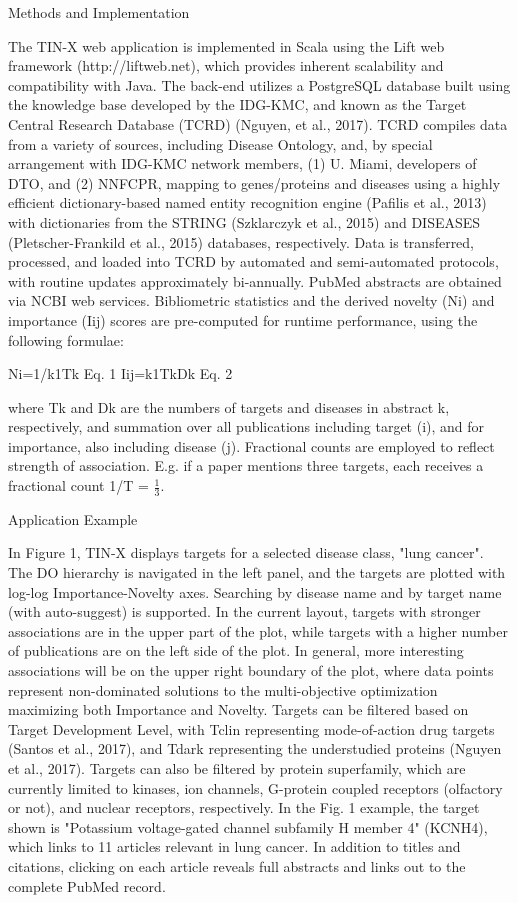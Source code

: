 Methods and Implementation

The TIN-X web application is implemented in Scala using the Lift web framework (http://liftweb.net), which provides inherent scalability and compatibility with Java.  The back-end utilizes a PostgreSQL database built using the knowledge base developed by the IDG-KMC, and known as the Target Central Research Database (TCRD) (Nguyen, et al., 2017).  TCRD compiles data from a variety of sources, including Disease Ontology, and, by special arrangement with IDG-KMC network members, (1) U. Miami, developers of DTO, and (2) NNFCPR, mapping to genes/proteins and diseases using a highly efficient dictionary-based named entity recognition engine (Pafilis et al., 2013) with dictionaries from the STRING (Szklarczyk et al., 2015) and DISEASES (Pletscher-Frankild et al., 2015) databases, respectively.  Data is transferred, processed, and loaded into TCRD by automated and semi-automated protocols, with routine updates approximately bi-annually.  PubMed abstracts are obtained via NCBI web services.  Bibliometric statistics and the derived novelty (Ni) and importance (Iij) scores are pre-computed for runtime performance, using the following formulae:

Ni=1/k1Tk      Eq. 1
Iij=k1TkDk    Eq. 2

where Tk and Dk are the numbers of targets and diseases in abstract k, respectively, and summation over all publications including target (i), and for importance, also including disease (j). Fractional counts are employed to reflect strength of association.  E.g. if a paper mentions three targets, each receives a fractional count 1/T = $\frac{1}{3}$.

Application Example

In Figure 1, TIN-X displays targets for a selected disease class, "lung cancer".  The DO hierarchy is navigated in the left panel, and the targets are plotted with log-log Importance-Novelty axes. Searching by disease name and by target name (with auto-suggest) is supported. In the current layout, targets with stronger associations are in the upper part of the plot, while targets with a higher number of publications are on the left side of the plot. In general, more interesting associations will be on the upper right boundary of the plot, where data points represent non-dominated solutions to the multi-objective optimization maximizing both Importance and Novelty.  Targets can be filtered based on Target Development Level, with Tclin representing mode-of-action drug targets (Santos et al., 2017), and Tdark representing the understudied proteins (Nguyen et al., 2017). Targets can also be filtered by protein superfamily, which are currently limited to kinases, ion channels, G-protein coupled receptors (olfactory or not), and nuclear receptors, respectively. In the Fig. 1 example, the target shown is "Potassium voltage-gated channel subfamily H member 4" (KCNH4), which links to 11 articles relevant in lung cancer.  In addition to titles and citations, clicking on each article reveals full abstracts and links out to the complete PubMed record. 

